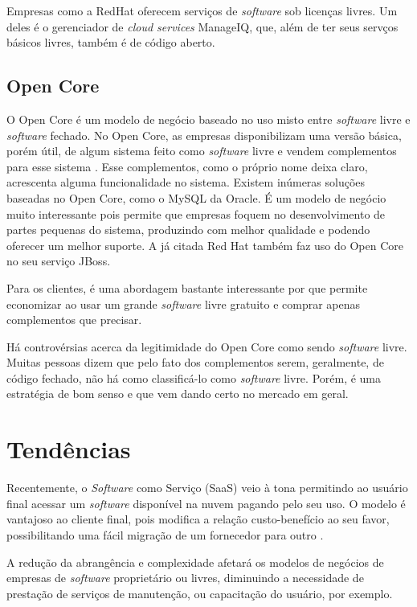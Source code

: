 \documentclass{classe_cn}                 %
\begin{document}
Empresas como a RedHat oferecem serviços de \textit{software} sob licenças livres. Um deles é o gerenciador de \textit{cloud services} ManageIQ, que, além de ter seus servços básicos livres, também é de código aberto.

\subsection{Open Core}

O Open Core é um modelo de negócio baseado no uso misto entre \textit{software} livre e \textit{software} fechado. No Open Core, as empresas disponibilizam uma versão básica, porém útil, de algum sistema feito como \textit{software} livre e vendem complementos para esse sistema \cite{riehle2012single}. Esse complementos, como o próprio nome deixa claro, acrescenta alguma funcionalidade no sistema. Existem inúmeras soluções baseadas no Open Core, como o MySQL da Oracle. É um modelo de negócio muito interessante pois permite que empresas foquem no desenvolvimento de partes pequenas do sistema, produzindo com melhor qualidade e podendo oferecer um melhor suporte.
A já citada Red Hat também faz uso do Open Core no seu serviço JBoss. 

Para os clientes, é uma abordagem bastante interessante por que permite economizar ao usar um grande \textit{software} livre gratuito e comprar apenas complementos que precisar.

Há controvérsias acerca da legitimidade do Open Core como sendo \textit{software} livre. Muitas pessoas dizem que pelo fato dos complementos serem, geralmente, de código fechado, não há como classificá-lo como \textit{software} livre. Porém, é uma estratégia de bom senso e que vem dando certo no mercado em geral.

\section{Tendências}

Recentemente, o \textit{Software} como Serviço (SaaS) veio à tona permitindo ao usuário final acessar um \textit{software} disponível na nuvem pagando pelo seu uso. O modelo é vantajoso ao cliente final, pois modifica a relação custo-benefício ao seu favor, possibilitando uma fácil migração de um fornecedor para outro \cite{Softex}.

A redução da abrangência e complexidade afetará os modelos de negócios de empresas de \textit{software} proprietário ou livres, diminuindo a necessidade de prestação de serviços de manutenção, ou capacitação do usuário, por exemplo. 
\end{document}
